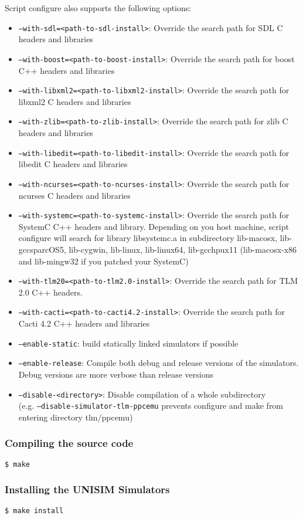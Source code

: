 Script configure also supports the following options:
\begin{itemize}
\item \texttt{--with-sdl=<path-to-sdl-install>}: Override the search path for SDL C headers and libraries
\item \texttt{--with-boost=<path-to-boost-install>}: Override the search path for boost C++ headers and libraries
\item \texttt{--with-libxml2=<path-to-libxml2-install>}: Override the search path for libxml2 C headers and libraries
\item \texttt{--with-zlib=<path-to-zlib-install>}: Override the search path for zlib C headers and libraries
\item \texttt{--with-libedit=<path-to-libedit-install>}: Override the search path for libedit C headers and libraries
\item \texttt{--with-ncurses=<path-to-ncurses-install>}: Override the search path for ncurses C headers and libraries
\item \texttt{--with-systemc=<path-to-systemc-install>}: Override the search path for SystemC C++ headers and library. Depending on you host machine, script configure will search for library libsystemc.a in subdirectory lib-macosx, lib-gccsparcOS5, lib-cygwin, lib-linux, lib-linux64, lib-gcchpux11 (lib-macosx-x86 and lib-mingw32 if you patched your SystemC)
\item \texttt{--with-tlm20=<path-to-tlm2.0-install>}: Override the search path for TLM 2.0 C++ headers.
\item \texttt{--with-cacti=<path-to-cacti4.2-install>}: Override the search path for Cacti 4.2 C++ headers and libraries
\item \texttt{--enable-static}: build statically linked simulators if possible
\item \texttt{--enable-release}: Compile both debug and release versions of the simulators. Debug versions are more verbose than release versions
\item \texttt{--disable-<directory>}: Disable compilation of a whole subdirectory\\ (e.g. \texttt{--disable-simulator-tlm-ppcemu} prevents configure and make from entering directory tlm/ppcemu)
\end{itemize}

\subsubsection{Compiling the source code}

\begin{verbatim}
$ make
\end{verbatim}

\subsubsection{Installing the UNISIM Simulators}

\begin{verbatim}
$ make install
\end{verbatim}
